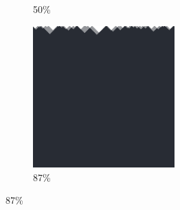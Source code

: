 \documentclass[12pt, fleqn]{report}                             %
\theoremstyle{break}                                            %
\begin{document}
\begin{figure}[ht!]
\begin{subfigure}[b]{0.4\linewidth}
          \caption{50\%}
        \end{subfigure}
        \begin{subfigure}[b]{0.4\linewidth}
          \includegraphics[width=0.6\textwidth]{Images/160/d.png}
          \caption{87\%}
        \end{subfigure}
      \end{figure}
\end{document}
